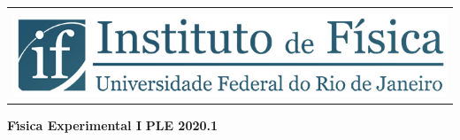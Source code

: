 \begin{titlepage}

\begin{center}
\begin{tabular}{@{}l}
\mbox{}\\[1mm]       
\hspace{0.8cm}
\includegraphics[width=14cm]{fig/logoiftop.jpg}
\end{tabular}%
%
\vskip 3.5cm
{\bf  \Huge F\'\i sica Experimental I}
\vskip 0.2cm
\vskip 7cm
{\bf \Large   PLE 2020.1}

\end{center}

\end{titlepage}


